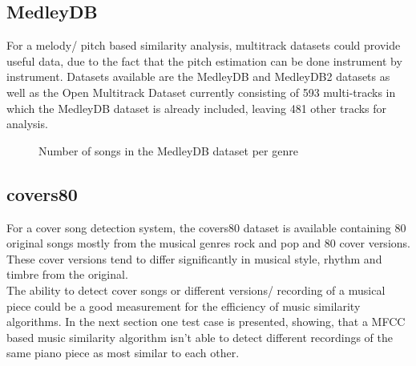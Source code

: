 \subsection{MedleyDB}

For a melody/ pitch based similarity analysis, multitrack datasets could provide useful data, due to the fact that the pitch estimation can be done instrument by instrument. 
Datasets available are the MedleyDB\cite{medleydb1} and MedleyDB2\cite{medleydb2} datasets as well as the Open Multitrack Dataset\cite{openmult1} currently consisting of 593 multi-tracks in which the MedleyDB dataset is already included, leaving 481 other tracks for analysis.

\begin{figure}[thpb]
	\centering
	\caption{Number of songs in the MedleyDB dataset per genre}
	\label{medleydbdist}
\end{figure}
\FloatBarrier

\subsection{covers80}

For a cover song detection system, the covers80 dataset is available \cite{cover80} containing 80 original songs mostly from the musical genres rock and pop and 80 cover versions. These cover versions tend to differ significantly in musical style, rhythm and timbre from the original.\\
The ability to detect cover songs or different versions/ recording of a musical piece could be a good measurement for the efficiency of music similarity algorithms. In the next section one test case is presented, showing, that a MFCC based music similarity algorithm isn't able to detect different recordings of the same piano piece as most similar to each other. 

